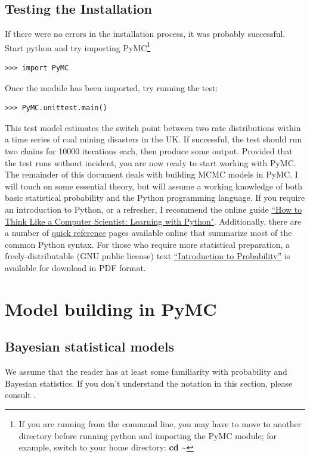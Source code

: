 \documentclass[]{book}
\begin{document}
\section{Testing the Installation}

If there were no errors in the installation process, it was probably successful. Start python and try importing PyMC\footnote{If you are running from the command line, you may have to move to another directory before running python and importing the PyMC module; for example, switch to your home directory: \textbf{cd \textasciitilde}}
\begin{verbatim}
>>> import PyMC
\end{verbatim}
Once the module has been imported, try running the test:
\begin{verbatim}
>>> PyMC.unittest.main()
\end{verbatim}

This test model estimates the switch point between two rate distributions within a time series of coal mining disasters in the UK. If successful, the test should run two chains for 10000 iterations each, then produce some output. Provided that the test runs without incident, you are now ready to start working with PyMC. The remainder of this document deals with building MCMC models in PyMC. I will touch on some essential theory, but will assume a working knowledge of both basic statistical probability and the Python programming language. If you require an introduction to Python, or a refresher, I recommend the online guide \href{http://www.ibiblio.org/obp/thinkCSpy/index.htm}{``How to Think Like a Computer Scientist: Learning with Python"}. Additionally, there are a number of \href{http://rgruet.free.fr/PQR24/PQR2.4.html}{quick reference} pages available online that summarize most of the common Python syntax. For those who require more statistical preparation, a freely-distributable (GNU public license) text \href{https://www.dartmouth.edu/~chance/teaching_aids/books_articles/probability_book/amsbook.mac.pdf}{``Introduction to Probability''} is available for download in PDF format.

\chapter{Model building in PyMC} %

\section{Bayesian statistical models}
We assume that the reader has at least some familiarity with probability and Bayesian statistics. If you don't understand the notation in this section, please consult \citet{Gelman:1996gp}.
\end{document}
